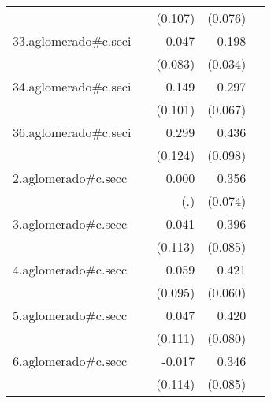 {\begin{longtable}{l*{4}{D{.}{.}{-1}}}
            &                     &     (0.107)         &     (0.076)         &                     \\
\addlinespace
33.aglomerado#c.seci&                     &       0.047         &       0.198\sym{***}&                     \\
            &                     &     (0.083)         &     (0.034)         &                     \\
\addlinespace
34.aglomerado#c.seci&                     &       0.149         &       0.297\sym{***}&                     \\
            &                     &     (0.101)         &     (0.067)         &                     \\
\addlinespace
36.aglomerado#c.seci&                     &       0.299\sym{*}  &       0.436\sym{***}&                     \\
            &                     &     (0.124)         &     (0.098)         &                     \\
\addlinespace
2.aglomerado#c.secc&                     &       0.000         &       0.356\sym{***}&                     \\
            &                     &         (.)         &     (0.074)         &                     \\
\addlinespace
3.aglomerado#c.secc&                     &       0.041         &       0.396\sym{***}&                     \\
            &                     &     (0.113)         &     (0.085)         &                     \\
\addlinespace
4.aglomerado#c.secc&                     &       0.059         &       0.421\sym{***}&                     \\
            &                     &     (0.095)         &     (0.060)         &                     \\
\addlinespace
5.aglomerado#c.secc&                     &       0.047         &       0.420\sym{***}&                     \\
            &                     &     (0.111)         &     (0.080)         &                     \\
\addlinespace
6.aglomerado#c.secc&                     &      -0.017         &       0.346\sym{***}&                     \\
            &                     &     (0.114)         &     (0.085)         &                     \\

\end{longtable}}
